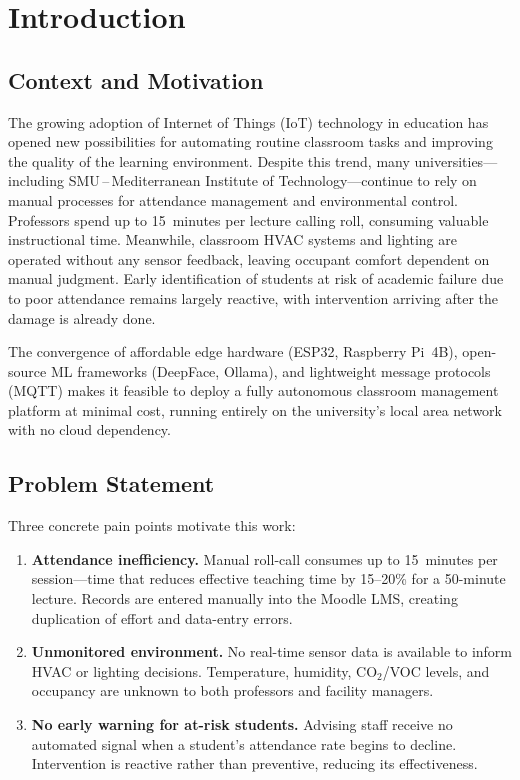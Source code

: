 \section{Introduction}
\label{sec:intro}

\subsection{Context and Motivation}
\label{subsec:context}

The growing adoption of Internet of Things (IoT) technology in education
has opened new possibilities for automating routine classroom tasks and
improving the quality of the learning environment.  Despite this trend,
many universities---including SMU\,--\,Mediterranean Institute of
Technology---continue to rely on manual processes for attendance
management and environmental control.  Professors spend up to 15~minutes
per lecture calling roll, consuming valuable instructional time.
Meanwhile, classroom HVAC systems and lighting are operated without any
sensor feedback, leaving occupant comfort dependent on manual judgment.
Early identification of students at risk of academic failure due to poor
attendance remains largely reactive, with intervention arriving after the
damage is already done.

The convergence of affordable edge hardware (ESP32, Raspberry Pi~4B),
open-source ML frameworks (DeepFace, Ollama), and lightweight message
protocols (MQTT) makes it feasible to deploy a fully autonomous
classroom management platform at minimal cost, running entirely on the
university's local area network with no cloud dependency.

\subsection{Problem Statement}
\label{subsec:problem}

Three concrete pain points motivate this work:

\begin{enumerate}
  \item \textbf{Attendance inefficiency.}  Manual roll-call consumes up
    to 15~minutes per session---time that reduces effective teaching time
    by 15--20\% for a 50-minute lecture.  Records are entered manually
    into the Moodle LMS, creating duplication of effort and data-entry
    errors.

  \item \textbf{Unmonitored environment.}  No real-time sensor data is
    available to inform HVAC or lighting decisions.  Temperature, humidity,
    CO$_2$/VOC levels, and occupancy are unknown to both professors and
    facility managers.

  \item \textbf{No early warning for at-risk students.}  Advising staff
    receive no automated signal when a student's attendance rate begins to
    decline.  Intervention is reactive rather than preventive, reducing
    its effectiveness.
\end{enumerate}

